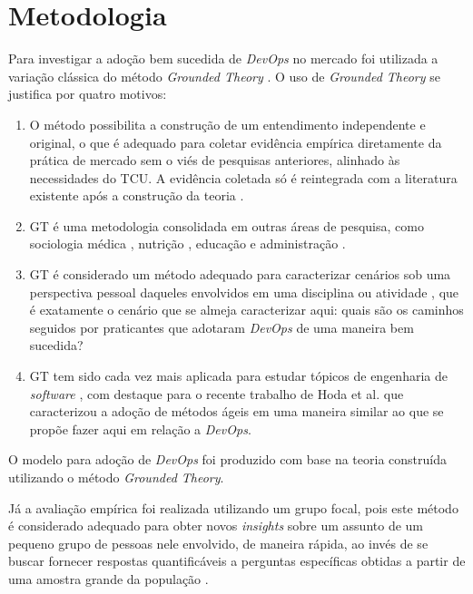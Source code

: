 \section{Metodologia}

Para investigar a adoção bem sucedida de \textit{DevOps} no mercado foi
utilizada a variação clássica do método \textit{Grounded Theory} \cite{glaser1967discovery}.
O uso de \textit{Grounded Theory} se justifica por quatro motivos:

\begin{enumerate}

\item O método possibilita a construção de um entendimento independente e original,
o que é adequado para coletar evidência empírica diretamente da prática de
mercado sem o viés de pesquisas anteriores, alinhado às necessidades do \acrshort{TCU}.
A evidência coletada só é reintegrada com a literatura existente após a
construção da teoria \cite{reconciling_perspectives,stol2016grounded}.

\item \acrshort{GT} é uma metodologia consolidada em outras áreas de
pesquisa, como sociologia médica \cite{gt_medical_sociology}, nutrição
\cite{gt_nursing}, educação \cite{gt_education} e administração
\cite{gt_management,locke2001grounded}.

\item \acrshort{GT} é considerado um método adequado para caracterizar cenários
sob uma perspectiva pessoal daqueles envolvidos em uma disciplina ou atividade \cite{stol2016grounded},
que é exatamente o cenário que se almeja caracterizar aqui: quais são os caminhos
seguidos por praticantes que adotaram \textit{DevOps} de uma maneira bem sucedida?

\item \acrshort{GT} tem sido cada vez mais aplicada para estudar tópicos de
engenharia de \textit{software} \cite{hoda2017becoming,Waterman:2015:ICSE,stol2016grounded},
com destaque para o recente trabalho de Hoda et al. \cite{hoda2017becoming} que
caracterizou a adoção de métodos ágeis em uma maneira similar ao que se propõe
fazer aqui em relação a \textit{DevOps}.

\end{enumerate}

O modelo para adoção de \textit{DevOps} foi produzido com base na teoria
construída utilizando o método \textit{Grounded Theory}.

Já a avaliação empírica foi realizada utilizando um grupo focal, pois este
método é considerado adequado para obter novos \textit{insights} sobre um
assunto de um pequeno grupo de pessoas nele envolvido, de maneira rápida, ao
invés de se buscar fornecer respostas quantificáveis a perguntas específicas
obtidas a partir de uma amostra grande da população \cite{focus_group_handbook,shull2007guide}.

